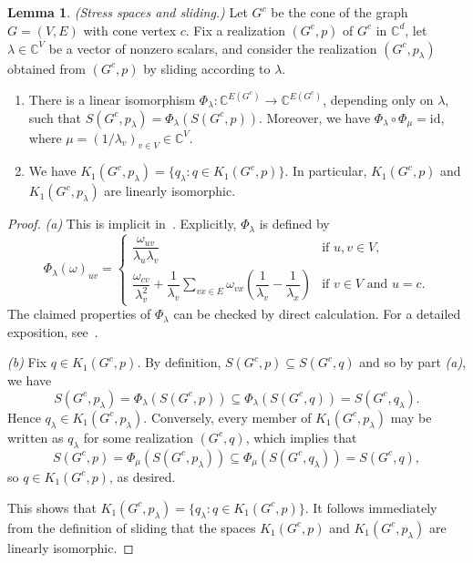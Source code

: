 \documentclass[11pt,a4paper,dvipsnames]{scrartcl}
\theoremstyle{definition}
\newtheorem{lemma}[theorem]{Lemma}
\newcommand{\CC}{\mathbb{C}}
\newcommand{\coneG}{G^c}
\begin{document}
\begin{lemma}\label{lemma:sliding} \emph{(Stress spaces and sliding.)} \newline
    Let $\coneG$ be the cone of the graph $G = (V,E)$ with cone vertex $c$. Fix a realization $(\coneG,p)$ of $\coneG$ in $\CC^d$, let $\lambda \in \CC^V$ be a vector of nonzero scalars, and consider the realization $(\coneG,p_\lambda)$ obtained from $(\coneG,p)$ by sliding according to $\lambda$.
    \begin{enumerate}
        \item There is a linear isomorphism $\Phi_\lambda : \CC^{E(\coneG)} \to \CC^{E(\coneG)}$, depending only on $\lambda$, such that $S(\coneG,p_\lambda) = \Phi_\lambda(S(\coneG,p))$. Moreover, we have $\Phi_\lambda \circ \Phi_{\mu} = \text{id}$, where $\mu = {(1/\lambda_v)}_{v \in V}  \in \CC^V$. 
        \item We have $K_1(\coneG,p_\lambda) = \{q_\lambda : q \in K_1(\coneG,p)\}$. In particular, $K_1(\coneG,p)$ and $K_1(\coneG,p_\lambda)$ are linearly isomorphic.
    \end{enumerate}
\end{lemma}
\begin{proof}
    \emph{(a)} This is implicit in~\cite[Lemma 4.9]{connelly.etal_2017}. Explicitly, $\Phi_\lambda$ is defined by 
    \[{\Phi_\lambda(\omega)}_{uv} = 
        \begin{cases}
        \dfrac{\omega_{uv}}{\lambda_u \lambda_v} &\text{if } u,v \in V, \\[10pt] \dfrac{\omega_{cv}}{\lambda_v^2} + \dfrac{1}{\lambda_v}{\displaystyle \sum_{vx \in E}}\omega_{vx}\left(\dfrac{1}{\lambda_v} - \dfrac{1}{\lambda_x}\right) &\text{if } v \in V \text{ and } u = c. 
        \end{cases}
    \]
    The claimed properties of $\Phi_\lambda$ can be checked by direct calculation. For a detailed exposition, see~\cite{martinwinter}.

    \emph{(b)} Fix $q \in K_1(\coneG,p)$. By definition, $S(\coneG,p) \subseteq S(\coneG,q)$ and so by part \emph{(a)}, we have \[S(\coneG,p_\lambda) = \Phi_\lambda\left(S(\coneG,p)\right) \subseteq \Phi_\lambda\left(S(\coneG,q)\right) = S(\coneG,q_\lambda).\] Hence $q_\lambda \in K_1(\coneG,p_\lambda)$. Conversely, every member of $K_1(\coneG,p_\lambda)$ may be written as $q_\lambda$ for some realization $(\coneG,q)$, which implies that \[S(\coneG,p) = \Phi_\mu(S(\coneG,p_\lambda)) \subseteq \Phi_\mu(S(\coneG,q_\lambda)) = S(\coneG,q),\] so $q \in K_1(\coneG,p)$, as desired. 
    
    This shows that $K_1(\coneG,p_\lambda) = \{q_\lambda : q \in K_1(\coneG,p)\}$. It follows immediately from the definition of sliding that the spaces $K_1(\coneG,p)$ and $K_1(\coneG,p_\lambda)$ are linearly isomorphic. 
\end{proof}
\end{document}
